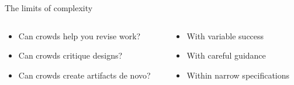 \documentclass[presentation]{subfiles}
\begin{document}


\begin{frame}{The limits of complexity}
  \begin{columns}
    \begin{column}{.6\textwidth}
    \end{column}
    \begin{column}{.4\textwidth}
    \end{column}
  \end{columns}
  \begin{columns}
  \begin{column}{.55\textwidth}
  \begin{itemize}
    \item<2-> Can crowds help you \alert{revise} work?\par
    \scriptsize{\textcite{bernsteinSoylent,Kim:2014:CSI:2556288.2556986,Nebeling:2016:WCW:2858036.2858169}\par}\normalsize{}
    \item<3-> Can crowds \alert{critique} designs?\par
    \scriptsize{\textcite{yuanAlmost,fuge2014analysis}\par}\normalsize{}
    \item<4-> Can crowds create artifacts \alert{de novo}?\par
    \scriptsize{\textcite{KimStoria,Kim2017,Hahn:2016:KAB:2858036.2858364,Lasecki:2014:LSR:2661334.2661352}\par}\normalsize{}
  \end{itemize}
  \end{column}
  \begin{column}{.45\textwidth}
      \begin{itemize}
        \item[$\Rightarrow$]<6-> \hfill With variable success\par
        \item[$\Rightarrow$]<7-> \hfill With careful guidance\par
        \item[$\Rightarrow$]<8-> \hfill Within narrow specifications\par
      \end{itemize}
  \end{column}
  \end{columns}
\end{frame}
\end{document}
